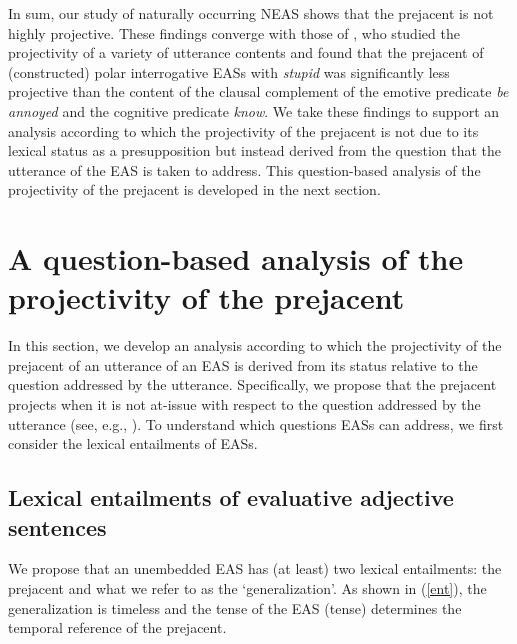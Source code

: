 \documentclass[11pt,fleqn]{article}
\newcommand{\6}{\mbox{$[\hspace*{-.6mm}[$}}
\newcommand{\9}{\mbox{$]\hspace*{-.6mm}]$}}
\begin{document}
In sum, our study of naturally occurring NEAS shows that the prejacent is not highly projective. These findings converge with those of \citet{tbd-variability}, who studied the projectivity of a variety of utterance contents and found that the prejacent of (constructed) polar interrogative EASs with {\em stupid} was significantly less projective than the content of the clausal complement of the emotive predicate {\em be annoyed} and the cognitive predicate {\em know}. We take these findings to support an analysis according to which the projectivity of the prejacent is not due to its lexical status as a presupposition but instead derived from the question that the utterance of the EAS is taken to address. This question-based analysis of the projectivity of the prejacent is developed in the next section.
 

\section{A question-based analysis of the projectivity of the prejacent}\label{s3}

In this section, we develop an analysis according to which the projectivity of the prejacent of an utterance of an EAS is derived from its status relative to the question addressed by the utterance. Specifically, we propose that the prejacent projects when it is not at-issue with respect to the question addressed by the utterance (see, e.g., \citealt{brst-salt10,brst-ar,best-question}). To understand which questions EASs can address, we first consider the lexical entailments of EASs.

\subsection{Lexical entailments of evaluative adjective sentences}\label{s31}

We propose that an unembedded EAS has (at least) two lexical entailments: the prejacent and what we refer to as the `generalization'. As shown in (\ref{ent}), the generalization is timeless and the tense of the EAS ({\sc tense}) determines the temporal reference of the prejacent.
\end{document}
